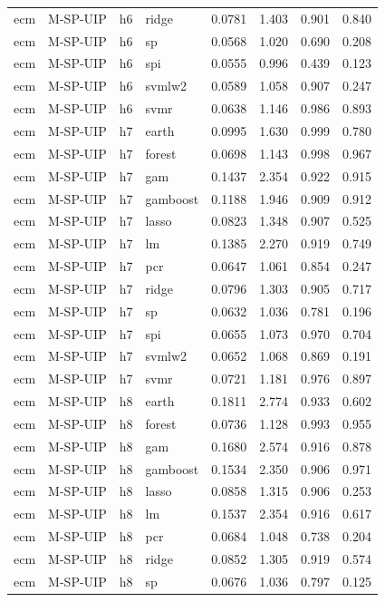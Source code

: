 \begin{ThreePartTable}
\begin{longtable}[t]{llclcccc}
ecm & M-SP-UIP & h6 & ridge & 0.0781 & 1.403 & 0.901 & 0.840\\
ecm & M-SP-UIP & h6 & sp & 0.0568 & 1.020 & 0.690 & 0.208\\
ecm & M-SP-UIP & h6 & spi & 0.0555 & 0.996 & 0.439 & 0.123\\
ecm & M-SP-UIP & h6 & svmlw2 & 0.0589 & 1.058 & 0.907 & 0.247\\
ecm & M-SP-UIP & h6 & svmr & 0.0638 & 1.146 & 0.986 & 0.893\\
\addlinespace
ecm & M-SP-UIP & h7 & earth & 0.0995 & 1.630 & 0.999 & 0.780\\
ecm & M-SP-UIP & h7 & forest & 0.0698 & 1.143 & 0.998 & 0.967\\
ecm & M-SP-UIP & h7 & gam & 0.1437 & 2.354 & 0.922 & 0.915\\
ecm & M-SP-UIP & h7 & gamboost & 0.1188 & 1.946 & 0.909 & 0.912\\
ecm & M-SP-UIP & h7 & lasso & 0.0823 & 1.348 & 0.907 & 0.525\\
ecm & M-SP-UIP & h7 & lm & 0.1385 & 2.270 & 0.919 & 0.749\\
ecm & M-SP-UIP & h7 & pcr & 0.0647 & 1.061 & 0.854 & 0.247\\
ecm & M-SP-UIP & h7 & ridge & 0.0796 & 1.303 & 0.905 & 0.717\\
ecm & M-SP-UIP & h7 & sp & 0.0632 & 1.036 & 0.781 & 0.196\\
ecm & M-SP-UIP & h7 & spi & 0.0655 & 1.073 & 0.970 & 0.704\\
ecm & M-SP-UIP & h7 & svmlw2 & 0.0652 & 1.068 & 0.869 & 0.191\\
ecm & M-SP-UIP & h7 & svmr & 0.0721 & 1.181 & 0.976 & 0.897\\
\addlinespace
ecm & M-SP-UIP & h8 & earth & 0.1811 & 2.774 & 0.933 & 0.602\\
ecm & M-SP-UIP & h8 & forest & 0.0736 & 1.128 & 0.993 & 0.955\\
ecm & M-SP-UIP & h8 & gam & 0.1680 & 2.574 & 0.916 & 0.878\\
ecm & M-SP-UIP & h8 & gamboost & 0.1534 & 2.350 & 0.906 & 0.971\\
ecm & M-SP-UIP & h8 & lasso & 0.0858 & 1.315 & 0.906 & 0.253\\
ecm & M-SP-UIP & h8 & lm & 0.1537 & 2.354 & 0.916 & 0.617\\
ecm & M-SP-UIP & h8 & pcr & 0.0684 & 1.048 & 0.738 & 0.204\\
ecm & M-SP-UIP & h8 & ridge & 0.0852 & 1.305 & 0.919 & 0.574\\
ecm & M-SP-UIP & h8 & sp & 0.0676 & 1.036 & 0.797 & 0.125\\

\end{longtable}
\end{ThreePartTable}
